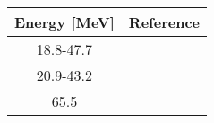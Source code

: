 \centering
\begin{tabular}{c c}
    \toprule
    \bf{Energy [MeV]} & \bf{Reference} \\
    \midrule
    18.8-47.7 & \cite{Carlson1975}\\
    20.9-43.2 & \cite{Slaus1975}\\
    65.5 & \cite{Ingemarsson1999}\\
    \bottomrule
\end{tabular}
